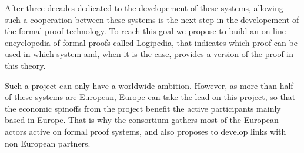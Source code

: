 After three decades dedicated to the developement of these systems,
allowing such a cooperation between these systems is the next step in
the developement of the formal proof technology.  To reach this goal
we propose to build an on line encyclopedia of formal proofs called
{\sc Logipedia}, that indicates which proof can be used in which
system and, when it is the case, provides a version of the proof in
this theory.

Such a project can only have a worldwide ambition. However, as more
than half of these systems are European, Europe can take the lead on
this project, so that the economic spinoffs from the project benefit
the active participants mainly based in Europe.  That is why the
consortium gathers most of the European actors active on formal proof
systems, and also proposes to develop links with non European
partners.


